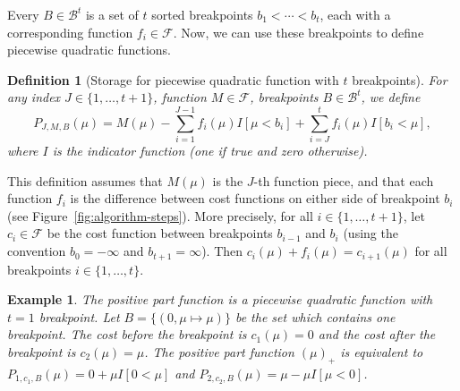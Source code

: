 \documentclass{article}
\newtheorem{theorem}{Theorem}
\newtheorem{definition}{Definition}
\newtheorem{example}{Example}
\begin{document}
Every $B\in\mathcal B^t$ is a set of $t$ sorted breakpoints
$b_1<\cdots<b_t$, each with a corresponding function
$f_i\in\mathcal F$. Now, we can use these breakpoints to define
piecewise quadratic functions.
\begin{definition}[Storage for piecewise quadratic function with $t$ breakpoints]
  For any index $J\in\{1,\dots, t+1\}$, function $M\in\mathcal F$,
  breakpoints $B\in\mathcal B^t$, we define
$$ 
P_{J,M,B}(\mu) = M(\mu)
-\sum_{i=1}^{J-1} f_i(\mu) I[\mu < b_i]
+\sum_{i=J}^t     f_i(\mu) I[b_i < \mu],
$$
where $I$ is the indicator function (one if true and zero otherwise).
\end{definition}
This definition assumes that $M(\mu)$ is the $J$-th function piece,
and that each function $f_i$ is the difference between cost functions
on either side of breakpoint $b_i$ (see
Figure~\ref{fig:algorithm-steps}). More precisely, for all
$i\in\{1,\dots,t+1\}$, let $c_i\in\mathcal F$ be the cost function
between breakpoints $b_{i-1}$ and $b_i$ (using the convention
$b_0=-\infty$ and $b_{t+1}=\infty$). Then
$c_i(\mu)+f_i(\mu)=c_{i+1}(\mu)$ for all breakpoints
$i\in\{1,\dots,t\}$.
\begin{example}
  The positive part function is a piecewise quadratic function with
  $t=1$ breakpoint. Let $B=\{(0,\mu\mapsto\mu)\}$ be the set which
  contains one breakpoint. The cost before the breakpoint is
  $c_1(\mu)=0$ and the cost after the breakpoint is
  $c_2(\mu)=\mu$. The positive part function $(\mu)_+$ is equivalent
  to $P_{1,c_1,B}(\mu)=0+\mu I[0 < \mu]$ and
  $P_{2,c_2,B}(\mu)=\mu - \mu I[\mu < 0]$.
\end{example}
\end{document}
